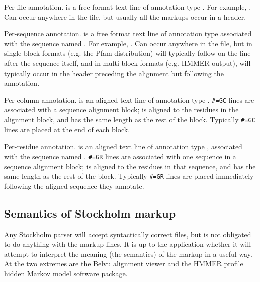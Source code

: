 \begin{wideitem}
\item {}
        Per-file annotation.  is a free format text line
        of annotation type . For example, . Can occur anywhere in the file, but usually
        all the  markups occur in a header.

\item {}
        Per-sequence annotation.  is a free format text line
        of annotation type  associated with the sequence
        named . For example, . Can occur anywhere
        in the file, but in single-block formats (e.g. the Pfam
        distribution) will typically follow on the line after the
        sequence itself, and in multi-block formats (e.g. HMMER
        output), will typically occur in the header preceding the
        alignment but following the  annotation.

\item {}
        Per-column annotation.  is an aligned text line
        of annotation type .
        \verb+#=GC+ lines are
        associated with a sequence alignment block; 
        is aligned to the residues in the alignment block, and has
        the same length as the rest of the block.
        Typically \verb+#=GC+ lines are placed at the end of each block.

\item {}
        Per-residue annotation.  is an aligned text line
        of annotation type , associated with the sequence
        named . 
        \verb+#=GR+ lines are 
        associated with one sequence in a sequence alignment block; 
        is aligned to the residues in that sequence, and has
        the same length as the rest of the block.
        Typically
        \verb+#=GR+ lines are placed immediately following the
        aligned sequence they annotate.
\end{wideitem}
\subsection{Semantics of Stockholm markup}

Any Stockholm parser will accept syntactically correct files, but is
not obligated to do anything with the markup lines. It is up to the
application whether it will attempt to interpret the meaning (the
semantics) of the markup in a useful way. At the two extremes are the
Belvu alignment viewer and the HMMER profile hidden Markov model
software package.

